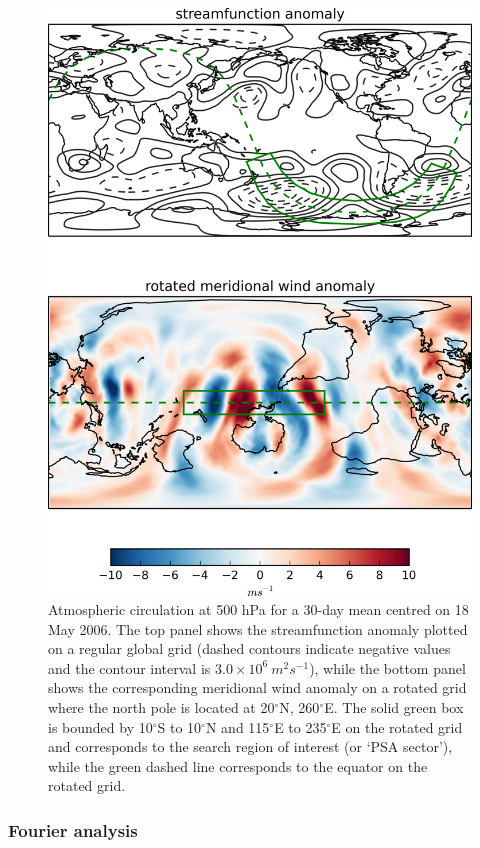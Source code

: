 \begin{figure}
\begin{center}
\includegraphics[width=0.7\columnwidth]{figures/psa/rotation_example_2006-05-18.png}
\caption[Coordinate system rotation and corresponding 500 hPa meridional wind conversion for a 30-day mean centred on 18 May 2006]{\label{fig:rotation}
Atmospheric circulation at 500 hPa for a 30-day mean centred on 18 May 2006. The top panel shows the streamfunction anomaly plotted on a regular global grid (dashed contours indicate negative values and the contour interval is $3.0 \times 10^6 \: m^2 s^{-1}$), while the bottom panel shows the corresponding meridional wind anomaly on a rotated grid where the north pole is located at 20$^{\circ}$N, 260$^{\circ}$E. The solid green box is bounded by 10$^{\circ}$S to 10$^{\circ}$N and 115$^{\circ}$E to 235$^{\circ}$E on the rotated grid and corresponds to the search region of interest (or `PSA sector'), while the green dashed line corresponds to the equator on the rotated grid.%
}
\end{center}
\end{figure}

\subsubsection{Fourier analysis}

